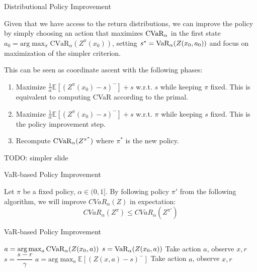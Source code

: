 \documentclass{beamer}
\begin{document}

\begin{frame}{Distributional Policy Improvement}

Given that we have access to the return distributions, we can improve the policy by simply choosing an action that maximizes $\text{CVaR}_\alpha$ in the first state $a_0 = \text{arg}\max_\pi\text{CVaR}_\alpha(Z^\pi(x_0))$, setting $s^* = \text{VaR}_\alpha(Z(x_0, a_0))$ and focus on maximization of the simpler criterion.

This can be seen as coordinate ascent with the following phases:
\begin{enumerate}
\item Maximize $\frac{1}{\alpha}\mathbb{E}\left[ (Z^\pi(x_0)-s)^-\right] + s$ w.r.t. $s$ while keeping $\pi$ fixed. This is equivalent to computing CVaR according to the primal.
\item Maximize $\frac{1}{\alpha}\mathbb{E}\left[ (Z^\pi(x_0)-s)^-\right] + s$ w.r.t. $\pi$ while keeping $s$ fixed. This is the policy improvement step.
\item Recompute $\text{CVaR}_\alpha (Z^{\pi^*})$ where $\pi^*$ is the new policy.
\end{enumerate}

TODO: simpler slide
\end{frame}



\begin{frame}{VaR-based Policy Improvement}
\begin{theorem}
Let $\pi$ be a fixed policy, $\alpha \in (0, 1]$. By following policy $\pi'$ from the following algorithm, we will improve $CVaR_\alpha(Z)$ in expectation: $$CVaR_\alpha(Z^\pi) \le CVaR_\alpha(Z^{\pi'})$$
\end{theorem}
\begin{block}{VaR-based Policy Improvement}
\begin{algorithmic}
    \STATE $a = \text{arg}\max_a \text{CVaR}_\alpha(Z(x_0, a))$
    \STATE $s = \text{VaR}_\alpha(Z(x_0, a))$
    \STATE Take action $a$, observe $x, r$
    	\STATE $s = \dfrac{s-r}{\gamma}$
    	\STATE $a = \text{arg}\max_a \mathbb{E}\left[(Z(x, a)-s)^- \right]$
    	\STATE Take action $a$, observe $x, r$
   	\ENDWHILE
\end{algorithmic}
\end{block}
\end{frame}
\end{document}

